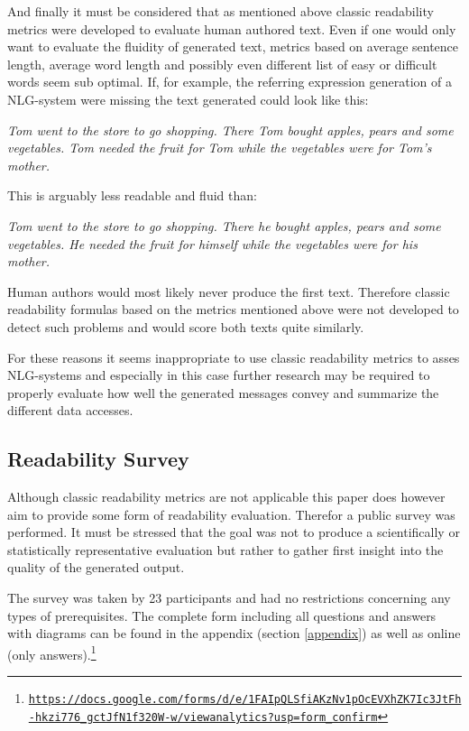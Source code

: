 \documentclass[sigconf,obeyspaces]{acmart}
\begin{document}
And finally it must be considered that as mentioned above classic readability metrics were developed to evaluate human authored text. Even if one would only want to evaluate the fluidity of generated text, metrics based on average sentence length, average word length and possibly even different list of easy or difficult words seem sub optimal. If, for example, the referring expression generation of a NLG-system were missing the text generated could look like this:
\begin{center}
    \emph{Tom went to the store to go shopping. There Tom bought apples, pears and some vegetables. Tom needed the fruit for Tom while the vegetables were for Tom's mother.}
\end{center}
This is arguably less readable and fluid than:
\begin{center}
    \emph{Tom went to the store to go shopping. There he bought apples, pears and some vegetables. He needed the fruit for himself while the vegetables were for his mother.}
\end{center}
Human authors would most likely never produce the first text. Therefore classic readability formulas based on the metrics mentioned above were not developed to detect such problems and would score both texts quite similarly.

For these reasons it seems inappropriate to use classic readability metrics to asses NLG-systems and especially in this case further research may be required to properly evaluate how well the generated messages convey and summarize the different data accesses.

\subsection{Readability Survey}
Although classic readability metrics are not applicable this paper does however aim to provide some form of readability evaluation. Therefor a public survey was performed. It must be stressed that the goal was not to produce a scientifically or statistically representative evaluation but rather to gather first insight into the quality of the generated output.

The survey was taken by 23 participants and had no restrictions concerning any types of prerequisites. The complete form including all questions and answers with diagrams can be found in the appendix (section \ref{appendix}) as well as online (only answers).\footnote{\texttt{\url{https://docs.google.com/forms/d/e/1FAIpQLSfiAKzNv1pOcEVXhZK7Ic3JtFh-hkzi776_gctJfN1f320W-w/viewanalytics?usp=form_confirm}}}
\end{document}
